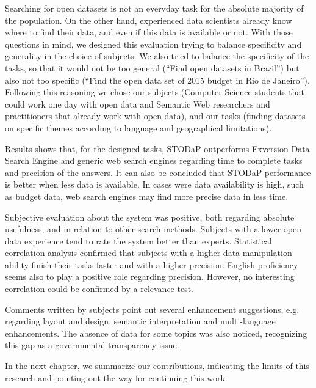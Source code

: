 Searching for open datasets is not an everyday task for the absolute majority of the population.
On the other hand, experienced data scientists already know where to find their data, and even if this data is available or not.
With those questions in mind, we designed this evaluation trying to balance specificity and generality in the choice of subjects.
We also tried to balance the specificity of the tasks, so that it would not be too general (``Find open datasets in Brazil'') but also not too specific (``Find the open data set of 2015 budget in Rio de Janeiro'').
Following this reasoning we chose our subjects (Computer Science students that could work one day with open data and Semantic Web researchers and practitioners that already work with open data), and our tasks (finding datasets on specific themes according to language and geographical limitations).

Results shows that, for the designed tasks, STODaP outperforms Exversion Data Search Engine and generic web search engines regarding time to complete tasks and precision of the answers.
It can also be concluded that STODaP performance is better when less data is available.
In cases were data availability is high, such as budget data, web search engines may find more precise data in less time.

Subjective evaluation about the system was positive, both regarding absolute usefulness, and in relation to other search methods.
Subjects with a lower open data experience tend to rate the system better than experts.
Statistical correlation analysis confirmed that subjects with a higher data manipulation ability finish their tasks faster and with a higher precision.
English proficiency seems also to play a positive role regarding precision.
However, no interesting correlation could be confirmed by a relevance test.

Comments written by subjects point out several enhancement suggestions, e.g. regarding layout and design, semantic interpretation and multi-language enhancements.
The absence of data for some topics was also noticed, recognizing this gap as a governmental transparency issue.

In the next chapter, we summarize our contributions, indicating the limits of this research and pointing out the way for continuing this work.
